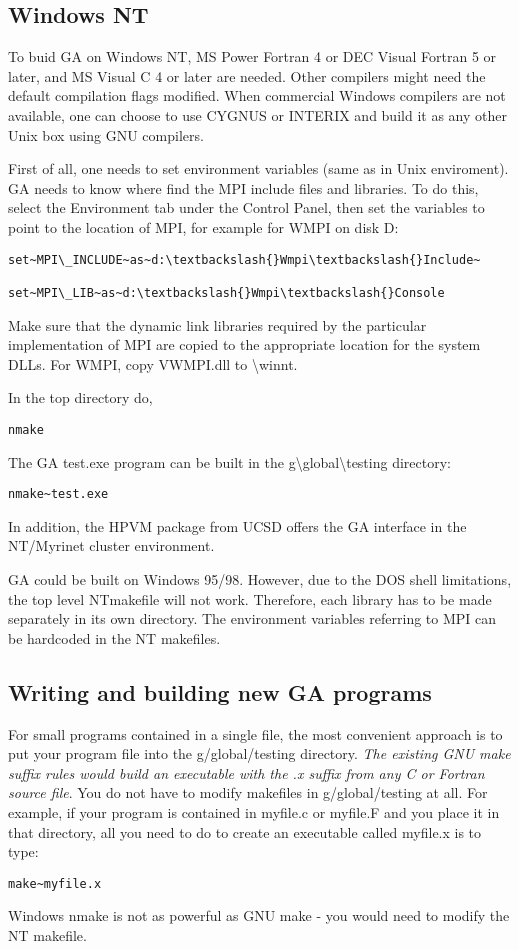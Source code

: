 \subsection{Windows NT }

To buid GA on Windows NT, MS Power Fortran 4 or DEC Visual Fortran
5 or later, and MS Visual C 4 or later are needed. Other compilers
might need the default compilation flags modified. When commercial
Windows compilers are not available, one can choose to use CYGNUS
or INTERIX and build it as any other Unix box using GNU compilers.

First of all, one needs to set environment variables (same as in Unix
enviroment). GA needs to know where find the MPI include files and
libraries. To do this, select the Environment tab under the Control
Panel, then set the variables to point to the location of MPI, for
example for WMPI on disk D:
\begin{verbatim}
set~MPI\_INCLUDE~as~d:\textbackslash{}Wmpi\textbackslash{}Include~

set~MPI\_LIB~as~d:\textbackslash{}Wmpi\textbackslash{}Console
\end{verbatim}
Make sure that the dynamic link libraries required by the particular
implementation of MPI are copied to the appropriate location for the
system DLLs. For WMPI, copy VWMPI.dll to \textbackslash{}winnt.

In the top directory do,
\begin{verbatim}
nmake
\end{verbatim}
The GA test.exe program can be built in the g\textbackslash{}global\textbackslash{}testing
directory:
\begin{verbatim}
nmake~test.exe
\end{verbatim}
In addition, the HPVM package from UCSD offers the GA interface in
the NT/Myrinet cluster environment.

GA could be built on Windows 95/98. However, due to the DOS shell
limitations, the top level NTmakefile will not work. Therefore, each
library has to be made separately in its own directory. The environment
variables referring to MPI can be hardcoded in the NT makefiles.


\subsection{Writing and building new GA programs}

For small programs contained in a single file, the most convenient
approach is to put your program file into the g/global/testing directory.
\emph{The existing GNU make suffix rules would build an executable
with the \textquotedbl{}.x\textquotedbl{} suffix from any C or Fortran
source file}. You do not have to modify makefiles in g/global/testing
at all. For example, if your program is contained in myfile.c or myfile.F
and you place it in that directory, all you need to do to create an
executable called myfile.x is to type: 
\begin{verbatim}
make~myfile.x
\end{verbatim}
Windows nmake is not as powerful as GNU make - you would need to modify
the NT makefile.

